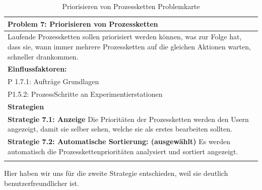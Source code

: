 \documentclass[enabledeprecatedfontcommands,fontsize=12pt,paper=a4,twoside]{scrartcl}
\begin{document}
\begin{table}[H]
    \centering
    \begin{tabular}{|p{15cm}|}
    \hline
          \textbf{Problem 7:} Priorisieren von Prozessketten
          \\ \hline
          Laufende Prozessketten sollen priorisiert werden können, was zur Folge hat, dass sie, wann immer mehrere Prozessketten auf die gleichen Aktionen warten, schneller drankommen. 
          \\ \hline
          \textbf{Einflussfaktoren: } \\
          P 1.7.1: Aufträge Grundlagen\\
	P1.5.2: ProzessSchritte an Experimentierstationen \\
          \hline
          \textbf{Strategien} \\ \hline
            {}          
           \label{strategie:7.1}     
          \textbf{Strategie 7.1: Anzeige} Die Prioritäten der Prozessketten werden den Usern angezeigt, damit sie selber sehen, welche sie als erstes bearbeiten sollten. \\
          \textbf{Strategie 7.2: Automatische Sortierung: (ausgewählt)} Es werden automatisch die Prozesskettenprioritäten analysiert und sortiert angezeigt. \\
          \\ \hline
    \end{tabular}
    \caption{Priorisieren von Prozessketten Problemkarte}
    \label{tab:ProblemKarte7}
\end{table}
Hier haben wir uns für die zweite Strategie entschieden, weil sie deutlich benutzerfreundlicher ist. \\
\end{document}
